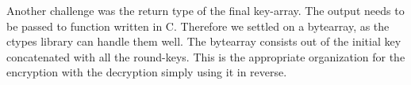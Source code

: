 Another challenge was the return type of the final key-array. The output needs to be passed to function written in C. Therefore we settled on a bytearray, as the ctypes library can handle them well. The bytearray consists out of the initial key concatenated with all the round-keys. This is the appropriate organization for the encryption with the decryption simply using it in reverse.
